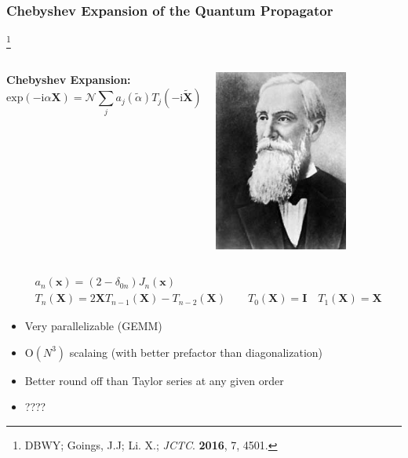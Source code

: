 \documentclass{beamer}
\newcommand{\bpar}[1]{\left( #1 \right)}                  %
\renewcommand{\exp}[1]{\mathrm{exp}\bpar{#1}}
\newcommand\blfootnote[1]{%
  \begingroup
  \renewcommand\thefootnote{}\footnote{#1}%
  \addtocounter{footnote}{-1}%
  \endgroup
}
\begin{document}
\begin{frame}
\frametitle{Chebyshev Expansion of the Quantum Propagator}
\blfootnote{DBWY; Goings, J.J; Li. X.; \emph{JCTC}. \textbf{2016}, 7, 4501.}

\begin{columns}
\begin{column}{0.7\textwidth}
\textbf{Chebyshev Expansion:}
\begin{equation*}
\exp{-\mathrm{i}\alpha \mathbf{X}} = \mathcal{N} \sum_j  a_j(\tilde{\alpha})T_j(-\mathrm{i}\tilde{\mathbf{X}})
\end{equation*}
\end{column}
\begin{column}{0.3\textwidth}
\includegraphics[width=0.7\textwidth]{Chebyshev}
\end{column}
\end{columns}
\begin{align*}
&a_n(\mathbf{x}) = (2 - \delta_{0n})J_n(\mathbf{x})\\
&T_n(\mathbf{X}) = 2\mathbf{X}T_{n-1}(\mathbf{X}) - T_{n-2}(\mathbf{X}) \qquad T_0(\mathbf{X}) = \mathbf{I} \quad T_1(\mathbf{X}) = \mathbf{X}
\end{align*}

\begin{itemize}
  \color{green}
  \item Very parallelizable (GEMM)
  \item O$(N^3)$ scalaing (with better prefactor than diagonalization)
  \item Better round off than Taylor series at any given order
\end{itemize}
\begin{itemize}
  \color{red}
  \item ????
\end{itemize}

\end{frame}
\end{document}
